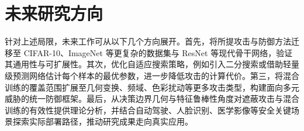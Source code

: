 \section{未来研究方向}

针对上述局限，未来工作可从以下几个方向展开。首先，将所提攻击与防御方法迁移至 CIFAR-10、ImageNet 等更复杂的数据集与 ResNet 等现代骨干网络，验证其通用性与可扩展性。其次，优化自适应搜索策略，例如引入二分搜索或借助轻量级预测网络估计每个样本的最优参数，进一步降低攻击的计算代价。第三，将混合训练的覆盖范围扩展至几何变换、频域、色彩扰动等更多攻击类型，构建面向多元威胁的统一防御框架。最后，从决策边界几何与特征鲁棒性角度对遮蔽攻击与混合训练的有效性提供理论分析，并结合自动驾驶、人脸识别、医学影像等安全关键场景探索实际部署路径，推动研究成果走向真实应用。
